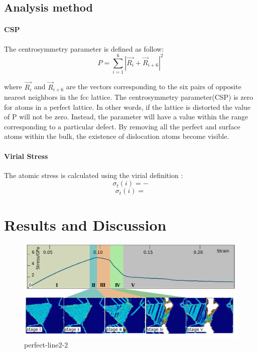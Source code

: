 \documentclass[journal,article,submit,moreauthors,pdftex,10pt,a4paper]{Definitions/mdpi}
\begin{document}
	\subsection{Analysis method}
	\paragraph{CSP}
	The centrosymmetry parameter is defined as follow:
	\begin{equation} \label{eq:csp} 
	P = \displaystyle\sum_{i=1}^{6}|\vec{R_i}+{\vec{R}}_{i+6}|^2
	\end{equation}
	
where $\vec{R_i}$ and ${\vec{R}}_{i+6}$ are the vectors corresponding to the six pairs of opposite nearest neighbors in the fcc lattice. The centrosymmetry parameter(CSP) is zero for atoms in a perfect lattice. In other words, if the lattice is distorted the value of P will not be zero. Instead, the parameter will have a value within the range corresponding to a particular defect. By removing all the perfect and surface atoms within the bulk, the existence of dislocation atoms become visible.
	
	\paragraph{Virial Stress}
	The atomic stress is calculated using the virial definition :
	$$\sigma_t(i)=-$$
	$$\sigma_t(i)= $$
	
	\section{Results and Discussion}
	
	\begin{figure}[h]
		\centering
		\includegraphics[width=1\linewidth]{img/perfect-line2-2}
		\caption{perfect-line2-2}
		\label{fig:perfect-line2-2}
	\end{figure}
\end{document}
